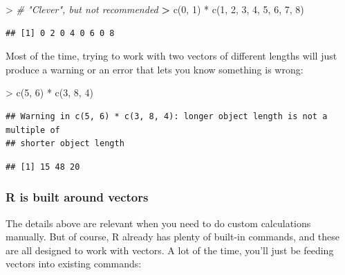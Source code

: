 \documentclass[
]{book}
\newenvironment{Shaded}{\begin{snugshade}}{\end{snugshade}}
\newcommand{\CommentTok}[1]{\textcolor[rgb]{0.56,0.35,0.01}{\textit{#1}}}
\newcommand{\DecValTok}[1]{\textcolor[rgb]{0.00,0.00,0.81}{#1}}
\newcommand{\ErrorTok}[1]{\textcolor[rgb]{0.64,0.00,0.00}{\textbf{#1}}}
\newcommand{\FunctionTok}[1]{\textcolor[rgb]{0.00,0.00,0.00}{#1}}
\newcommand{\NormalTok}[1]{#1}
\newcommand{\SpecialCharTok}[1]{\textcolor[rgb]{0.00,0.00,0.00}{#1}}
\begin{document}
\begin{Shaded}
\begin{Highlighting}[]
\SpecialCharTok{\textgreater{}} \CommentTok{\# "Clever", but not recommended}
\ErrorTok{\textgreater{}} \FunctionTok{c}\NormalTok{(}\DecValTok{0}\NormalTok{, }\DecValTok{1}\NormalTok{) }\SpecialCharTok{*} \FunctionTok{c}\NormalTok{(}\DecValTok{1}\NormalTok{, }\DecValTok{2}\NormalTok{, }\DecValTok{3}\NormalTok{, }\DecValTok{4}\NormalTok{, }\DecValTok{5}\NormalTok{, }\DecValTok{6}\NormalTok{, }\DecValTok{7}\NormalTok{, }\DecValTok{8}\NormalTok{)}
\end{Highlighting}
\end{Shaded}

\begin{verbatim}
## [1] 0 2 0 4 0 6 0 8
\end{verbatim}

Most of the time, trying to work with two vectors of different lengths
will just produce a warning or an error that lets you know something
is wrong:

\begin{Shaded}
\begin{Highlighting}[]
\SpecialCharTok{\textgreater{}} \FunctionTok{c}\NormalTok{(}\DecValTok{5}\NormalTok{, }\DecValTok{6}\NormalTok{) }\SpecialCharTok{*} \FunctionTok{c}\NormalTok{(}\DecValTok{3}\NormalTok{, }\DecValTok{8}\NormalTok{, }\DecValTok{4}\NormalTok{)}
\end{Highlighting}
\end{Shaded}

\begin{verbatim}
## Warning in c(5, 6) * c(3, 8, 4): longer object length is not a multiple of
## shorter object length
\end{verbatim}

\begin{verbatim}
## [1] 15 48 20
\end{verbatim}

\hypertarget{r-is-built-around-vectors}{%
\subsubsection{R is built around vectors}\label{r-is-built-around-vectors}}

The details above are relevant when you need to do custom calculations
manually. But of course, R already has plenty of built-in commands,
and these are all designed to work with vectors. A lot of the time,
you'll just be feeding vectors into existing commands:
\end{document}
